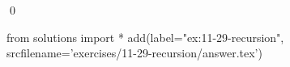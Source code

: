 
\begin{ex}
  \label{ex:11-29-recursion}
  
  \qed
\end{ex}
\begin{python0}
from solutions import *
add(label="ex:11-29-recursion",
    srcfilename='exercises/11-29-recursion/answer.tex')
\end{python0}
